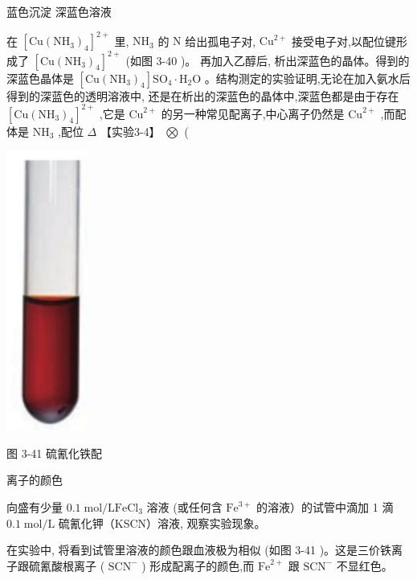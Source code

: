 \documentclass[10pt]{article}
\begin{document}
蓝色沉淀 深蓝色溶液

在 \({\left\lbrack \mathrm{{Cu}}{\left( {\mathrm{{NH}}}_{3}\right) }_{4}\right\rbrack }^{2 + }\) 里, \({\mathrm{{NH}}}_{3}\) 的 \(\mathrm{N}\) 给出孤电子对, \({\mathrm{{Cu}}}^{2 + }\) 接受电子对,以配位键形成了 \({\left\lbrack \mathrm{{Cu}}{\left( {\mathrm{{NH}}}_{3}\right) }_{4}\right\rbrack }^{2 + }\) (如图 3-40 )。 再加入乙醇后, 析出深蓝色的晶体。得到的深蓝色晶体是 \(\left\lbrack {\mathrm{{Cu}}{\left( {\mathrm{{NH}}}_{3}\right) }_{4}}\right\rbrack {\mathrm{{SO}}}_{4} \cdot {\mathrm{H}}_{2}\mathrm{O}\) 。结构测定的实验证明,无论在加入氨水后得到的深蓝色的透明溶液中, 还是在析出的深蓝色的晶体中,深蓝色都是由于存在 \({\left\lbrack \mathrm{{Cu}}{\left( {\mathrm{{NH}}}_{3}\right) }_{4}\right\rbrack }^{2 + }\) ,它是 \({\mathrm{{Cu}}}^{2 + }\) 的另一种常见配离子,中心离子仍然是 \({\mathrm{{Cu}}}^{2 + }\) ,而配体是 \({\mathrm{{NH}}}_{3}\) ,配位 \(\Delta\) 【实验3-4】 \(\bigotimes\) (

\begin{center}
\includegraphics[max width=0.2\textwidth]{images/0190e026-5a11-7df7-bd27-54d09026ba7a_100_966780.jpg}
\end{center}

图 3-41 硫氰化铁配

离子的颜色

向盛有少量 \({0.1}\mathrm{\;{mol}}/\mathrm{L}{\mathrm{{FeCl}}}_{3}\) 溶液 (或任何含 \({\mathrm{{Fe}}}^{3 + }\) 的溶液）的试管中滴加 1 滴 \({0.1}\mathrm{\;{mol}}/\mathrm{L}\) 硫氰化钾（KSCN）溶液, 观察实验现象。

在实验中, 将看到试管里溶液的颜色跟血液极为相似 (如图 3-41 )。这是三价铁离子跟硫氰酸根离子 ( \({\mathrm{{SCN}}}^{ - }\) ) 形成配离子的颜色,而 \({\mathrm{{Fe}}}^{2 + }\) 跟 \({\mathrm{{SCN}}}^{ - }\) 不显红色。
\end{document}
